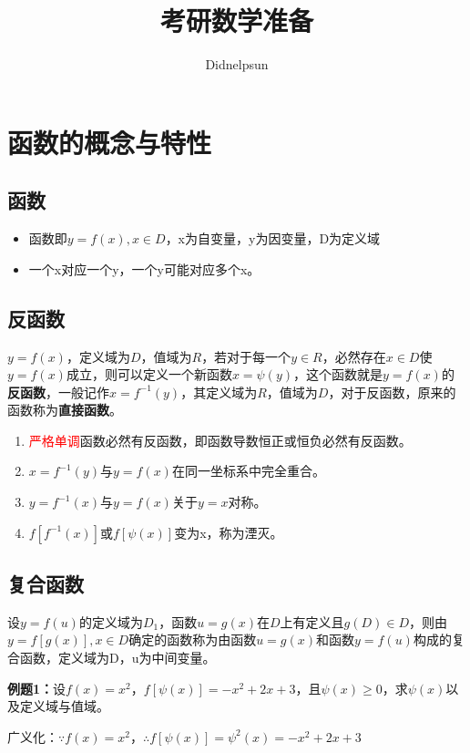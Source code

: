 \documentclass[UTF8, 12pt]{ctexart}
\author{Didnelpsun}
\title{考研数学准备}
\begin{document}
\renewcommand\arraystretch{1.5}
\maketitle
\thispagestyle{empty}
\tableofcontents
\thispagestyle{empty}
\newpage
\pagestyle{plain}
\setcounter{page}{1}
\section{函数的概念与特性}
\subsection{函数}
\begin{itemize}
    \item 函数即$y=f(x),x\in D$，x为自变量，y为因变量，D为定义域
    \item 一个x对应一个y，一个y可能对应多个x。
\end{itemize}
\subsection{反函数}
$y=f(x)$，定义域为$D$，值域为$R$，若对于每一个$y\in R$，必然存在$x\in D$使$y=f(x)$成立，则可以定义一个新函数$x=\psi(y)$，这个函数就是$y=f(x)$的\textbf{反函数}，一般记作$x=f^{-1}(y)$，其定义域为$R$，值域为$D$，对于反函数，原来的函数称为\textbf{直接函数}。
\begin{enumerate}
    \item \textcolor{red}{严格单调}函数必然有反函数，即函数导数恒正或恒负必然有反函数。
    \item $x=f^{-1}(y)$与$y=f(x)$在同一坐标系中完全重合。
    \item $y=f^{-1}(x)$与$y=f(x)$关于$y=x$对称。
    \item $f[f^{-1}(x)]$或$f[\psi(x)]$变为x，称为湮灭。
\end{enumerate}
\subsection{复合函数}
设$y=f(u)$的定义域为$D_1$，函数$u=g(x)$在$D$上有定义且$g(D)\in D$，则由$y=f[g(x)],x\in D$确定的函数称为由函数$u=g(x)$和函数$y=f(u)$构成的复合函数，定义域为D，u为中间变量。

\textbf{例题1：}设$f(x)=x^2$，$f[\psi(x)]=-x^2+2x+3$，且$\psi(x)\geqslant 0$，求$\psi(x)$以及定义域与值域。

广义化：$\because f(x)=x^2$，$\therefore f[\psi(x)]=\psi^2(x)=-x^2+2x+3$
\end{document}
